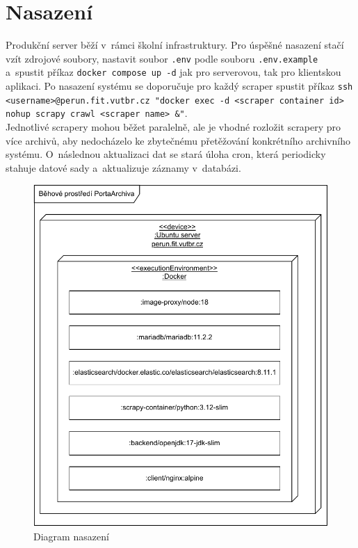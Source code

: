 \chapter{Nasazení}
 Produkční server běží v~rámci školní infrastruktury. Pro úspěšné nasazení stačí vzít zdrojové soubory, nastavit soubor \texttt{.env} podle souboru \texttt{.env.example} a~spustit příkaz \texttt{docker compose up -d} jak pro serverovou, tak pro klientskou aplikaci. Po nasazení systému se doporučuje pro každý scraper spustit příkaz \texttt{ssh <username>@perun.fit.vutbr.cz "docker exec -d <scraper container id> nohup scrapy crawl <scraper name> \&"}. \\Jednotlivé scrapery mohou běžet paralelně, ale je vhodné rozložit scrapery pro více archivů, aby nedocházelo ke zbytečnému přetěžování konkrétního archivního systému. O~následnou aktualizaci dat se stará úloha cron, která periodicky stahuje datové sady a~aktualizuje záznamy v~databázi.


\begin{figure}[htbp]
\centering
    \includegraphics[scale=1]{obrazky-figures/deployment/deployment_diagram.pdf}
    \caption{Diagram nasazení}
\end{figure}